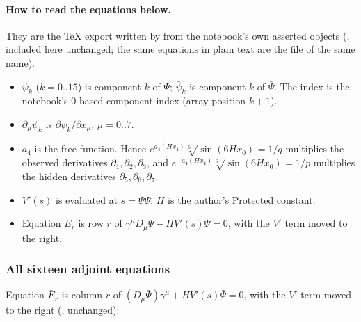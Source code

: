 \paragraph{How to read the equations below.} They are the TeX export written by
 from the notebook's own asserted objects
(, included here unchanged; the
same equations in plain text are the  file of the same name).
\begin{itemize}
  \item $\psi_k$ ($k=0..15$) is component $k$ of $\Psi$; $\bar\psi_k$ is component $k$ of $\bar\Psi$.
        The index is the notebook's 0-based component index (array position $k+1$).
  \item $\partial_\mu\psi_k$ is $\partial\psi_k/\partial x_\mu$, $\mu=0..7$.
  \item $a_4$ is the free function. Hence $e^{a_4(Hx_4)}\sqrt[6]{\sin(6Hx_0)}=1/q$ multiplies the
        observed derivatives $\partial_1,\partial_2,\partial_3$, and
        $e^{-a_4(Hx_4)}\sqrt[6]{\sin(6Hx_0)}=1/p$ multiplies the hidden derivatives
        $\partial_5,\partial_6,\partial_7$.
  \item $V'(s)$ is evaluated at $s=\bar\Psi\Psi$; $H$ is the author's Protected constant.
  \item Equation $E_r$ is row $r$ of $\gamma^\mu D_\mu\Psi-HV'(s)\Psi=0$, with the $V'$ term moved to
        the right.
\end{itemize}

{\small

}

\subsubsection{All sixteen adjoint equations}
\label{sec:3.4.5}

Equation $\bar E_r$ is column $r$ of $(D_\mu\bar\Psi)\gamma^\mu+HV'(s)\bar\Psi=0$, with the $V'$ term
moved to the right (, unchanged):

{\small

}

